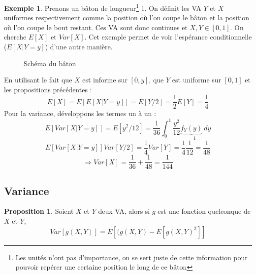 \documentclass[a4paper,12pt]{report}
\theoremstyle{definition}
\renewcommand{\(}{\left(}
\renewcommand{\)}{\right)}
\newtheorem{exmp}[thm]{Exemple}
\newtheorem{prop}[thm]{Proposition}
\begin{document}
        \begin{exmp}
                Prenons un bâton de longueur\footnote{Les unités n'ont pas d'importance, on se sert juste de cette information pour pouvoir repérer une certaine position le long de ce bâton} $1$. On définit les VA $Y$ et $X$ uniformes respectivement comme la position où l'on coupe le bâton et la position où l'on coupe le bout restant. Ces VA sont donc continues et $X,Y\in[0,1]$. On cherche $E[X]$ et $Var[X]$. Cet exemple permet de voir l'espérance conditionnelle ($E[X|Y=y]$) d'une autre manière.
                
                \begin{figure}[H]
                    \centering
                    \caption{Schéma du bâton}
                \end{figure}
                En utilisant le fait que $X$ est informe sur $[0,y]$, que $Y$ est uniforme sur $[0,1]$ et les propositions précédentes :
                $$E[X] = E[E[X|Y=y]] = E[Y/2] = \frac{1}{2}E[Y] = \frac{1}{4}$$
                Pour la variance, développons les termes un à un :
                $$E[Var[X|Y=y]] = E[y^2/12] = \frac{1}{36}\int_0^{1}\frac{y^2}{12}\underbrace{f_Y(y)}_{=1}~dy$$
                $$E[Var[X|Y=y]]Var[Y/2] = \frac{1}{4}Var[Y] = \frac{1}{4}\frac{1}{12} = \frac{1}{48}$$
                $$\Rightarrow Var[X] = \frac{1}{36}+\frac{1}{48} = \frac{1}{144}$$
            \end{exmp}
        
        \subsection{Variance}
        
            \begin{leftbar}
            \begin{prop}
                Soient $X$ et $Y$ deux VA, alors si $g$ est une fonction quelconque de $X$ et $Y$,
                $$Var[g(X,Y)] = E[(g(X,Y)-E[g(X,Y)^2]]$$
            \end{prop}
            \end{leftbar}
            
\end{document}

